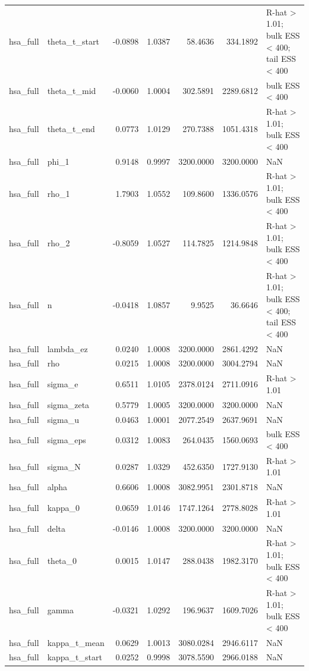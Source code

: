 \begin{tabular}{llrrrrl}
hsa\_full & theta\_t\_start & -0.0898 & 1.0387 & 58.4636 & 334.1892 & R-hat > 1.01; bulk ESS < 400; tail ESS < 400 \\
hsa\_full & theta\_t\_mid & -0.0060 & 1.0004 & 302.5891 & 2289.6812 & bulk ESS < 400 \\
hsa\_full & theta\_t\_end & 0.0773 & 1.0129 & 270.7388 & 1051.4318 & R-hat > 1.01; bulk ESS < 400 \\
hsa\_full & phi\_1 & 0.9148 & 0.9997 & 3200.0000 & 3200.0000 & NaN \\
hsa\_full & rho\_1 & 1.7903 & 1.0552 & 109.8600 & 1336.0576 & R-hat > 1.01; bulk ESS < 400 \\
hsa\_full & rho\_2 & -0.8059 & 1.0527 & 114.7825 & 1214.9848 & R-hat > 1.01; bulk ESS < 400 \\
hsa\_full & n & -0.0418 & 1.0857 & 9.9525 & 36.6646 & R-hat > 1.01; bulk ESS < 400; tail ESS < 400 \\
hsa\_full & lambda\_ez & 0.0240 & 1.0008 & 3200.0000 & 2861.4292 & NaN \\
hsa\_full & rho & 0.0215 & 1.0008 & 3200.0000 & 3004.2794 & NaN \\
hsa\_full & sigma\_e & 0.6511 & 1.0105 & 2378.0124 & 2711.0916 & R-hat > 1.01 \\
hsa\_full & sigma\_zeta & 0.5779 & 1.0005 & 3200.0000 & 3200.0000 & NaN \\
hsa\_full & sigma\_u & 0.0463 & 1.0001 & 2077.2549 & 2637.9691 & NaN \\
hsa\_full & sigma\_eps & 0.0312 & 1.0083 & 264.0435 & 1560.0693 & bulk ESS < 400 \\
hsa\_full & sigma\_N & 0.0287 & 1.0329 & 452.6350 & 1727.9130 & R-hat > 1.01 \\
hsa\_full & alpha & 0.6606 & 1.0008 & 3082.9951 & 2301.8718 & NaN \\
hsa\_full & kappa\_0 & 0.0659 & 1.0146 & 1747.1264 & 2778.8028 & R-hat > 1.01 \\
hsa\_full & delta & -0.0146 & 1.0008 & 3200.0000 & 3200.0000 & NaN \\
hsa\_full & theta\_0 & 0.0015 & 1.0147 & 288.0438 & 1982.3170 & R-hat > 1.01; bulk ESS < 400 \\
hsa\_full & gamma & -0.0321 & 1.0292 & 196.9637 & 1609.7026 & R-hat > 1.01; bulk ESS < 400 \\
hsa\_full & kappa\_t\_mean & 0.0629 & 1.0013 & 3080.0284 & 2946.6117 & NaN \\
hsa\_full & kappa\_t\_start & 0.0252 & 0.9998 & 3078.5590 & 2966.0188 & NaN \\

\end{tabular}
